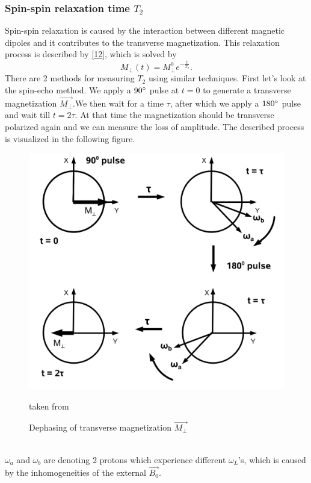 \subsubsection{Spin-spin relaxation time $T_{2}$}
Spin-spin relaxation is caused by the interaction between different magnetic dipoles and it contributes to the transverse magnetization. This relaxation process is described by \eqref{12}, which is solved by 
\begin{equation}
	\label{15}
	M_{\perp}(t) = M_{\perp}^{0}e^{-\frac{t}{T_{2}}}.
\end{equation}
There are 2 methods for measuring $T_2$ using similar techniques. First let's look at the spin-echo method. We apply a $90\degree$ pulse at $t = 0$ to generate a transverse magnetization $\vec{M_{\perp}}$.We then wait for a time $\tau$, after which we apply a $180\degree$ pulse and wait till $t=2\tau$. At that time the magnetization should be transverse polarized again and we can measure the loss of amplitude. The described process is visualized in the following figure.
\begin{figure}[h!]
	\centering
	\includegraphics[scale=0.53]{images/spin_echo.png}
	\caption{Dephasing of transverse magnetization $\vec{M_{\perp}}$} taken from \cite{manual}
	\label{spin-spin}
\end{figure} \\
$\omega_a$ and $\omega_b$ are denoting 2 protons which experience different $\omega_L$'s, which is caused by the inhomogeneities of the external $\vec{B_0}$.\\
